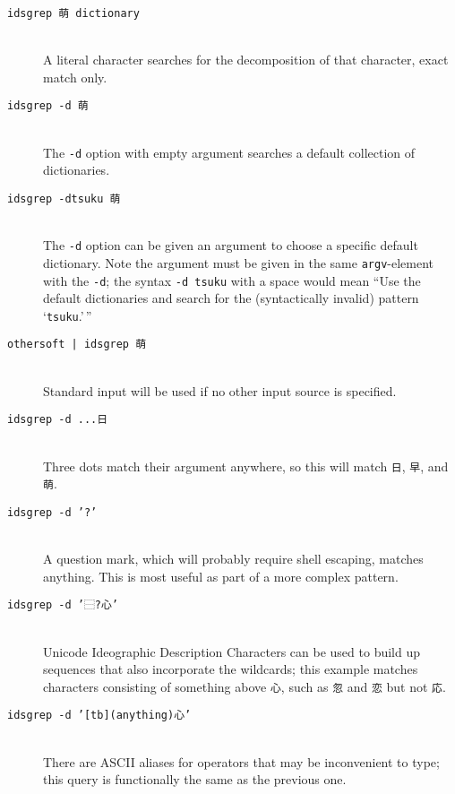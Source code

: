 \documentclass[twocolumn]{report}
\begin{document}
\begin{description}
\item[\texttt{idsgrep 萌 dictionary}]~\\
  A literal character searches for the decomposition of that character,
  exact match only.
\item[\texttt{idsgrep -d 萌}]~\\
  The \texttt{-d} option with empty argument searches a default collection
  of dictionaries.
\item[\texttt{idsgrep -dtsuku 萌}]~\\
  The \texttt{-d} option can be given an argument to choose a specific
  default dictionary.  Note the argument must be given in the same
  \texttt{argv}-element with the \texttt{-d}; the syntax \texttt{-d tsuku}
  with a space would mean ``Use the default dictionaries and search for the
  (syntactically invalid) pattern `\texttt{tsuku}.'\,''
\item[\texttt{othersoft | idsgrep 萌}]~\\
  Standard input will be used if no other input source is specified.
\item[\texttt{idsgrep -d ...日}]~\\
  Three dots match their argument anywhere, so this will match \texttt{日},
  \texttt{早}, and \texttt{萌}.
\item[\texttt{idsgrep -d '?'}]~\\
  A question mark, which will probably require shell escaping, matches
  anything.  This is most useful as part of a more complex pattern.
\item[\texttt{idsgrep -d '⿱?心'}]~\\
  Unicode Ideographic Description Characters can be used to build up
  sequences that also
  incorporate the wildcards; this example matches characters
  consisting of something above \texttt{心}, such as \texttt{忽} and
  \texttt{恋} but not \texttt{応}.
\item[\texttt{idsgrep -d '[tb](anything)心'}]~\\
  There are ASCII aliases
  for operators that may be inconvenient to type; this query is
  functionally the same as the previous one.
\end{description}

\end{document}
